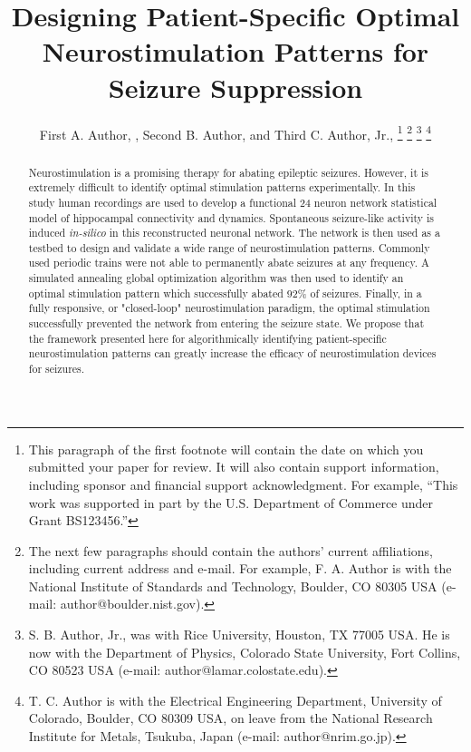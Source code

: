 \documentclass[journal,twoside,web]{ieeecolor}
\newcommand{\nn}{24}    %
\newcommand{\success}{92} %
\begin{document}
\title{Designing Patient-Specific Optimal Neurostimulation Patterns for Seizure Suppression}
\author{First A. Author, , Second B. Author, and Third C. Author, Jr., 
\thanks{This paragraph of the first footnote will contain the date on 
which you submitted your paper for review. It will also contain support 
information, including sponsor and financial support acknowledgment. For 
example, ``This work was supported in part by the U.S. Department of 
Commerce under Grant BS123456.'' }
\thanks{The next few paragraphs should contain 
the authors' current affiliations, including current address and e-mail. For 
example, F. A. Author is with the National Institute of Standards and 
Technology, Boulder, CO 80305 USA (e-mail: author@boulder.nist.gov). }
\thanks{S. B. Author, Jr., was with Rice University, Houston, TX 77005 USA. He is 
now with the Department of Physics, Colorado State University, Fort Collins, 
CO 80523 USA (e-mail: author@lamar.colostate.edu).}
\thanks{T. C. Author is with 
the Electrical Engineering Department, University of Colorado, Boulder, CO 
80309 USA, on leave from the National Research Institute for Metals, 
Tsukuba, Japan (e-mail: author@nrim.go.jp).}}

\maketitle

\begin{abstract}
Neurostimulation is a promising therapy for abating epileptic seizures.
However, it is extremely difficult to identify optimal stimulation patterns experimentally.
In this study human recordings are used to develop a functional \nn{} neuron network statistical model of hippocampal connectivity and dynamics. 
Spontaneous seizure-like activity is induced \textit{in-silico} in this reconstructed neuronal network.
The network is then used as a testbed to design and validate a wide range of neurostimulation patterns.
Commonly used periodic trains were not able to permanently abate seizures at any frequency.
A simulated annealing global optimization algorithm was then used to identify an optimal stimulation pattern which successfully abated \success{}\% of seizures.
Finally, in a fully responsive, or "closed-loop" neurostimulation paradigm, the optimal stimulation successfully prevented the network from entering the seizure state.
We propose that the framework presented here for algorithmically identifying patient-specific neurostimulation patterns can greatly increase the efficacy of neurostimulation devices for seizures.
\end{abstract}
\end{document}

